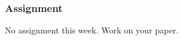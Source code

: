 \documentclass[color=usenames,dvipsnames]{beamer}\usepackage[]{graphicx}\usepackage[]{color}
\begin{document}
\begin{frame}[fragile]
  \frametitle{Assignment}
  No assignment this week. Work on your paper. \\
\end{frame}
\end{document}
